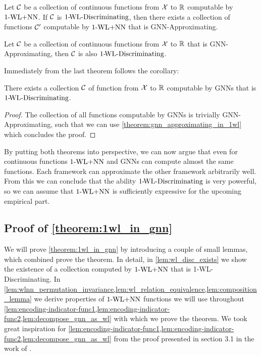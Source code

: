 \begin{theorem}\label{theorem:1wl_in_gnn_approximating}
    Let $\mathcal{C}$ be a collection of continuous functions from $\mathcal{X}$ to $\mathbb{R}$ computable by $\text{1-WL+NN}$. If $\mathcal{C}$ is $\text{1-\!WL-Discriminating}$, then there exists a collection of functions $\mathcal{C}'$ computable by $\text{1-WL+NN}$ that is GNN-Approximating.
\end{theorem}

\begin{theorem}\label{theorem:gnn_approximating_in_1wl}
    Let $\mathcal{C}$ be a collection of continuous functions from $\mathcal{X}$ to $\mathbb{R}$ that is GNN-Approximating, then $\mathcal{C}$ is also $\text{1-\!WL-Discriminating}$.
\end{theorem}

Immediately from the last theorem follows the corollary:
\begin{corollary}
    There exists a collection $\mathcal{C}$ of function from $\mathcal{X}$ to $\mathbb{R}$ computable by GNNs that is $\text{1-\!WL-Discriminating}$.
\end{corollary}

\begin{proof}
    The collection of all functions computable by GNNs is trivially GNN-Approximating, such that we can use \autoref*{theorem:gnn_approximating_in_1wl} which concludes the proof.
\end{proof}

By putting both theorems into perspective, we can now argue that even for continuous functions $\text{1-WL+NN}$ and GNNs can compute almost the same functions. Each framework can approximate the other framework arbitrarily well. From this we can conclude that the ability $\text{1-\!WL-Discriminating}$ is very powerful, so we can assume that $\text{1-WL+NN}$ is sufficiently expressive for the upcoming empirical part.

\subsection{Proof of \autoref{theorem:1wl_in_gnn}}\label{sec:proof_theorem:1wl_in_gnn}
We will prove \autoref{theorem:1wl_in_gnn} by introducing a couple of small lemmas, which combined prove the theorem. In detail, in \autoref{lem:wl_disc_exists} we show the existence of a collection computed by $\text{1-WL+NN}$ that is 1-\!WL-Discriminating. In \cref{lem:wlnn_permutation_invariance,lem:wl_relation_equivalence,lem:composition_lemma} we derive properties of $\text{1-WL+NN}$ functions we will use throughout \cref{lem:encoding-indicator-func1,lem:encoding-indicator-func2,lem:decompose_gnn_as_wl} with which we prove the theorem.
We took great inspiration for \cref{lem:encoding-indicator-func1,lem:encoding-indicator-func2,lem:decompose_gnn_as_wl} from the proof presented in section 3.1 in the work of \cite{Chen2019}.

